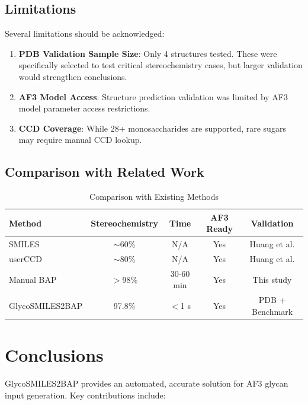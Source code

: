 \documentclass[11pt,a4paper]{article}
\begin{document}
\subsection{Limitations}

Several limitations should be acknowledged:
\begin{enumerate}
\item \textbf{PDB Validation Sample Size}: Only 4 structures tested. These were specifically selected to test critical stereochemistry cases, but larger validation would strengthen conclusions.

\item \textbf{AF3 Model Access}: Structure prediction validation was limited by AF3 model parameter access restrictions.

\item \textbf{CCD Coverage}: While 28+ monosaccharides are supported, rare sugars may require manual CCD lookup.
\end{enumerate}

\subsection{Comparison with Related Work}

\begin{table}[h]
\centering
\caption{Comparison with Existing Methods}
\begin{tabular}{lcccc}
\toprule
Method & Stereochemistry & Time & AF3 Ready & Validation \\
\midrule
SMILES & $\sim$60\% & N/A & Yes & Huang et al. \\
userCCD & $\sim$80\% & N/A & Yes & Huang et al. \\
Manual BAP & $>$98\% & 30-60 min & Yes & This study \\
GlycoSMILES2BAP & 97.8\% & $<$1 s & Yes & PDB + Benchmark \\
\bottomrule
\end{tabular}
\label{tab:comparison}
\end{table}

\section{Conclusions}

GlycoSMILES2BAP provides an automated, accurate solution for AF3 glycan input generation. Key contributions include:
\end{document}
